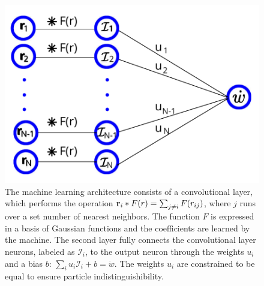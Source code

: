 \documentclass[amsmath,preprintnumbers,10pt,nofootinbib,prl,twocolumn]{revtex4-1}
\begin{document}
\begin{figure}
    \centering
    \includegraphics[scale=0.5, clip=True]{ML_architecture.pdf}
    \caption{The machine learning architecture consists of a convolutional layer, which performs the operation ${\bf r}_i * F(r) = \sum_{j \neq i} F(r_{ij})$, where $j$ runs over a set number of nearest neighbors. The function $F$ is expressed in a basis of Gaussian functions and the coefficients are learned by the machine. The second layer fully connects the convolutional layer neurons, labeled as $\mathcal{I}_i$, to the output neuron through the weights $u_i$ and a bias $b$:  $\sum_i u_i {\mathcal{I}_i} +b = \dot{w}$. The weights $u_i$ are constrained to be equal to ensure particle indistinguishibility.}
    \label{Fig:ML}
\end{figure}



\end{document}
